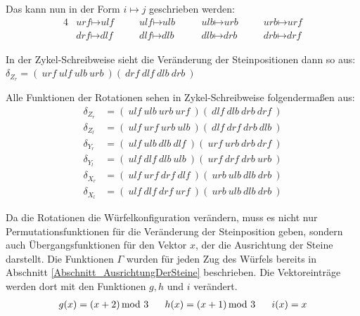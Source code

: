 \documentclass[12pt,a4paper, usenames, dvipsnames]{article}
\theoremstyle{mystyle}
\theoremstyle{definition}
\begin{document}
Das kann nun in der Form $i \mapsto j$ geschrieben werden: 
\begin{alignat*}{4}
& \textit{urf} \mapsto \textit{ulf} \ \ \ \ \ \ \ \ & \textit{ulf} \mapsto \textit{ulb} \ \ \ \ \ \ \ \ & \textit{ulb} \mapsto \textit{urb} \ \ \ \ \ \ \ \ & \textit{urb} \mapsto \textit{urf} \\
& \textit{drf} \mapsto \textit{dlf} \ \ \ \ \ \ \ \ & \textit{dlf} \mapsto \textit{dlb} \ \ \ \ \ \ \ \ \ & \textit{dlb} \mapsto \textit{drb} \ \ \ \ \ \ \ \ & \textit{drb} \mapsto \textit{drf}
\end{alignat*}

In der Zykel-Schreibweise sieht die Veränderung der Steinpositionen dann so aus: \\
$\delta_{Z_r}=( \ \textit{urf} \ \textit{ulf} \ \textit{ulb} \ \textit{urb} \ )( \ \textit{drf} \ \textit{dlf} \ \textit{dlb} \ \textit{drb} \  )$ 

Alle Funktionen der Rotationen sehen in Zykel-Schreibweise folgendermaßen aus:
\begin{align*}
\delta_{Z_r} & = ( \ \textit{ulf} \ \textit{ulb} \ \textit{urb} \ \textit{urf}\ )(\ \textit{dlf} \ \textit{dlb} \ \textit{drb} \ \textit{drf} \ )\\
\delta_{Z_l} & = ( \ \textit{ulf} \ \textit{urf} \ \textit{urb} \ \textit{ulb}\ )(\ \textit{dlf} \ \textit{drf} \ \textit{drb} \ \textit{dlb} \ )\\
\delta_{Y_r} & = ( \ \textit{ulf} \ \textit{ulb} \ \textit{dlb} \ \textit{dlf}\ )(\ \textit{urf} \ \textit{urb} \ \textit{drb} \ \textit{drf} \ )\\
\delta_{Y_l} & = ( \ \textit{ulf} \ \textit{dlf} \ \textit{dlb} \ \textit{ulb}\ )(\ \textit{urf} \ \textit{drf} \ \textit{drb} \ \textit{urb} \ )\\
\delta_{X_r} & = ( \ \textit{ulf} \ \textit{urf} \ \textit{drf} \ \textit{dlf}\ )(\ \textit{urb} \ \textit{ulb} \ \textit{dlb} \ \textit{drb} \ )\\
\delta_{X_l} & = ( \ \textit{ulf} \ \textit{dlf} \ \textit{drf} \ \textit{urf}\ )(\ \textit{urb} \ \textit{ulb} \ \textit{dlb} \ \textit{drb} \ )
\end{align*}

Da die Rotationen die Würfelkonfiguration verändern, muss es nicht nur Permutationsfunktionen für die Veränderung der Steinposition geben, sondern auch Übergangsfunktionen für den Vektor $x$, der die Ausrichtung der Steine darstellt. Die Funktionen $\Gamma$ wurden für jeden Zug des Würfels bereits in Abschnitt \ref{Abschnitt_AusrichtungDerSteine} beschrieben. Die Vektoreinträge werden dort mit den Funktionen $g, h$ und $i$ verändert.
\begin{align*}
g(x)=(x + 2) \hspace*{-0.5em} \mod 3 \ \ \ \ \ h(x) = (x+1) \hspace*{-0.5em} \mod 3 \ \ \ \ \ i(x)=x
\end{align*}
\end{document}

